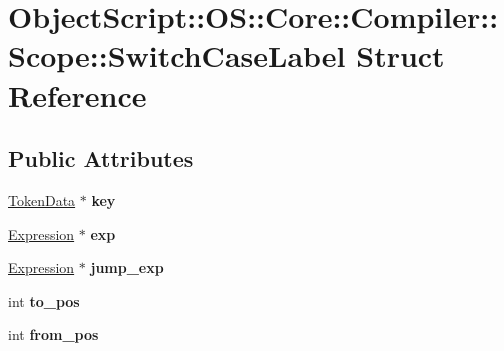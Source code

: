 \hypertarget{struct_object_script_1_1_o_s_1_1_core_1_1_compiler_1_1_scope_1_1_switch_case_label}{}\section{Object\+Script\+:\+:OS\+:\+:Core\+:\+:Compiler\+:\+:Scope\+:\+:Switch\+Case\+Label Struct Reference}
\label{struct_object_script_1_1_o_s_1_1_core_1_1_compiler_1_1_scope_1_1_switch_case_label}
\subsection*{Public Attributes}
\begin{DoxyCompactItemize}
\item 
\hyperlink{class_object_script_1_1_o_s_1_1_core_1_1_tokenizer_1_1_token_data}{Token\+Data} $\ast$ {\bfseries key}\hypertarget{struct_object_script_1_1_o_s_1_1_core_1_1_compiler_1_1_scope_1_1_switch_case_label_a056b9dd5cb79cd62efb67ba12e716152}{}\label{struct_object_script_1_1_o_s_1_1_core_1_1_compiler_1_1_scope_1_1_switch_case_label_a056b9dd5cb79cd62efb67ba12e716152}

\item 
\hyperlink{struct_object_script_1_1_o_s_1_1_core_1_1_compiler_1_1_expression}{Expression} $\ast$ {\bfseries exp}\hypertarget{struct_object_script_1_1_o_s_1_1_core_1_1_compiler_1_1_scope_1_1_switch_case_label_a87ed62b02657d3be82b7223a3474b279}{}\label{struct_object_script_1_1_o_s_1_1_core_1_1_compiler_1_1_scope_1_1_switch_case_label_a87ed62b02657d3be82b7223a3474b279}

\item 
\hyperlink{struct_object_script_1_1_o_s_1_1_core_1_1_compiler_1_1_expression}{Expression} $\ast$ {\bfseries jump\+\_\+exp}\hypertarget{struct_object_script_1_1_o_s_1_1_core_1_1_compiler_1_1_scope_1_1_switch_case_label_abf5dc27ddf6d7cd1cc7891e81ad0dd3f}{}\label{struct_object_script_1_1_o_s_1_1_core_1_1_compiler_1_1_scope_1_1_switch_case_label_abf5dc27ddf6d7cd1cc7891e81ad0dd3f}

\item 
int {\bfseries to\+\_\+pos}\hypertarget{struct_object_script_1_1_o_s_1_1_core_1_1_compiler_1_1_scope_1_1_switch_case_label_a78688ebfc112cf9241a145e58d305a01}{}\label{struct_object_script_1_1_o_s_1_1_core_1_1_compiler_1_1_scope_1_1_switch_case_label_a78688ebfc112cf9241a145e58d305a01}

\item 
int {\bfseries from\+\_\+pos}\hypertarget{struct_object_script_1_1_o_s_1_1_core_1_1_compiler_1_1_scope_1_1_switch_case_label_a5d0d2c4da98cdb326f4d5e6a7f6767f0}{}\label{struct_object_script_1_1_o_s_1_1_core_1_1_compiler_1_1_scope_1_1_switch_case_label_a5d0d2c4da98cdb326f4d5e6a7f6767f0}

\end{DoxyCompactItemize}


